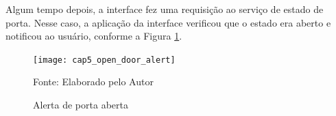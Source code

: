 Algum tempo depois, a interface fez uma requisição ao serviço de estado de porta. Nesse caso, a aplicação da interface verificou que o estado era aberto e notificou ao usuário, conforme a Figura \ref{fig:cap5_open_door_alert}.


\begin{figure}[htb]
    \caption{Alerta de porta aberta}
    \label{fig:cap5_open_door_alert}
    \texttt{[image: cap5\_open\_door\_alert]}
    
    \footnotesize{Fonte: Elaborado pelo Autor}
\end{figure}




